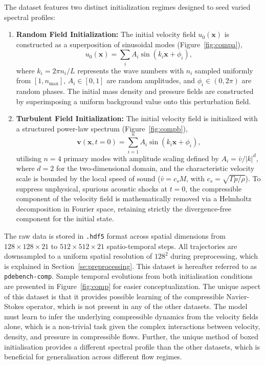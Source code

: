 The dataset features two distinct initialization regimes designed to seed varied spectral profiles:
\begin{enumerate}
    \item \textbf{Random Field Initialization:} The initial velocity field $u_0(\mathbf{x})$ is constructed as a superposition of sinusoidal modes (Figure~\ref{fig:compa}),
    \begin{equation}
        u_0(\mathbf{x}) = \sum_{i} A_i \sin(k_i \mathbf{x} + \phi_i),
        \label{eq:random_ic}
    \end{equation}
    where $k_i = 2\pi n_i / L$ represents the wave numbers with $n_i$ sampled uniformly from $[1, n_{\mathrm{max}}]$, $A_i \in [0,1]$ are random amplitudes, and $\phi_i \in (0, 2\pi)$ are random phases. The initial mass density and pressure fields are constructed by superimposing a uniform background value onto this perturbation field.
    
    \item \textbf{Turbulent Field Initialization:} The initial velocity field is initialized with a structured power-law spectrum (Figure~\ref{fig:compb}),
    \begin{equation}
        \mathbf{v}(\mathbf{x}, t=0) = \sum_{i=1}^{n} A_i \sin(k_i \mathbf{x} + \phi_i),
        \label{eq:turb_ic}
    \end{equation}
    utilising $n = 4$ primary modes with amplitude scaling defined by $A_i = \bar{v}/|k|^d$, where $d=2$ for the two-dimensional domain, and the characteristic velocity scale is bounded by the local speed of sound ($\bar{v} = c_s M$, with $c_s = \sqrt{\Gamma p / \rho}$). To suppress unphysical, spurious acoustic shocks at $t=0$, the compressible component of the velocity field is mathematically removed via a Helmholtz decomposition in Fourier space, retaining strictly the divergence-free component for the initial state.
\end{enumerate}

The raw data is stored in \texttt{.hdf5} format across spatial dimensions from $128 \times 128 \times 21$ to $512 \times 512 \times 21$ spatio-temporal steps. All trajectories are downsampled to a uniform spatial resolution of $128^2$ during preprocessing, which is explained in Section~\ref{se:preprocessing}. This dataset is hereafter referred to as \texttt{pdebench-comp}. Sample temporal evolutions from both initialisation conditions are presented in Figure~\ref{fig:comp} for easier conceptualization. The unique aspect of this dataset is that it provides possible learning of the compressible Navier-Stokes operator, which is not present in any of the other datasets. The model must learn to infer the underlying compressible dynamics from the velocity fields alone, which is a non-trivial task given the complex interactions between velocity, density, and pressure in compressible flows. Further, the unique method of boxed initialisation provides a different spectral profile than the other datasets, which is beneficial for generalisation across different flow regimes.

